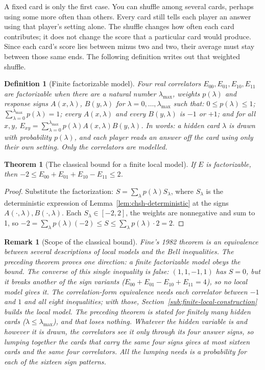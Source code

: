 \documentclass[11pt,twoside]{article}
\theoremstyle{thielethm}
\newtheorem{theorem}{Theorem}[section]
\theoremstyle{thieledef}
\newtheorem{definition}{Definition}[section]
\theoremstyle{thieledef}
\newtheorem{remark}{Remark}[section]
\theoremstyle{thieledef}
\theoremstyle{thielethm}
\theoremstyle{thieleobs}
\theoremstyle{thielethm}
\begin{document}
A fixed card is only the first case. You can shuffle among several cards,
perhaps using some more often than others. Every card still tells each player
an answer using that player's setting alone. The shuffle changes how often
each card contributes; it does not change the score that a particular card
would produce. Since each card's score lies between minus two and two, their
average must stay between those same ends. The following definition writes
out that weighted shuffle.

\begin{definition}[Finite factorizable model]
Four real correlators $E_{00}, E_{01}, E_{10}, E_{11}$ are factorizable when there are a
natural number $\lambda_{\max}$, weights $p(\lambda)$ and response signs $A(x, \lambda)$,
$B(y, \lambda)$ for $\lambda = 0, \ldots, \lambda_{\max}$ such that:
$0 \le p(\lambda) \le 1$;
$\sum_{\lambda = 0}^{\lambda_{\max}} p(\lambda) = 1$; every $A(x, \lambda)$ and every
$B(y, \lambda)$ is $-1$ or $+1$; and for all $x, y$,
$E_{xy} = \sum_{\lambda=0}^{\lambda_{\max}} p(\lambda) A(x, \lambda) B(y, \lambda)$.
In words: a hidden card $\lambda$ is drawn with probability $p(\lambda)$, and each player reads
an answer off the card using only their own setting. Only the correlators are modelled.
\end{definition}

\begin{theorem}[The classical bound for a finite local model]
If $E$ is factorizable, then $-2 \le E_{00} + E_{01} + E_{10} - E_{11} \le 2$.
\end{theorem}

\begin{proof}
Substitute the factorization: $S = \sum_\lambda p(\lambda) S_\lambda$, where $S_\lambda$ is
the deterministic expression of Lemma~\ref{lem:chsh-deterministic} at the signs
$A(\cdot, \lambda), B(\cdot, \lambda)$. Each $S_\lambda \in [-2, 2]$, the weights are
nonnegative and sum to 1, so $-2 = \sum_\lambda p(\lambda)(-2) \le S \le
\sum_\lambda p(\lambda) \cdot 2 = 2$.
\end{proof}

\begin{remark}[Scope of the classical bound]\label{rem:chsh-fine-scope}
Fine's 1982 theorem is an equivalence between several descriptions of local models and the
Bell inequalities. The preceding theorem proves one direction: a finite factorizable model
obeys the bound. The converse of this single inequality is false: $(1, 1, -1, 1)$ has $S = 0$,
but it breaks another of the sign variants ($E_{00} + E_{01} - E_{10} + E_{11} = 4$), so no
local model gives it. The correlation-form equivalence needs each correlator between $-1$ and $1$
and all eight inequalities; with those, Section~\ref{sub:finite-local-construction} builds the
local model. The preceding theorem is stated for finitely many hidden cards ($\lambda\le\lambda_{\max}$), and that loses nothing. Whatever the hidden variable is and however it is drawn, the correlators see it only through its four answer signs, so lumping together the cards that carry the same four signs gives at most sixteen cards and the same four correlators. All the lumping needs is a probability for each of the sixteen sign patterns. \end{remark}
\end{document}
